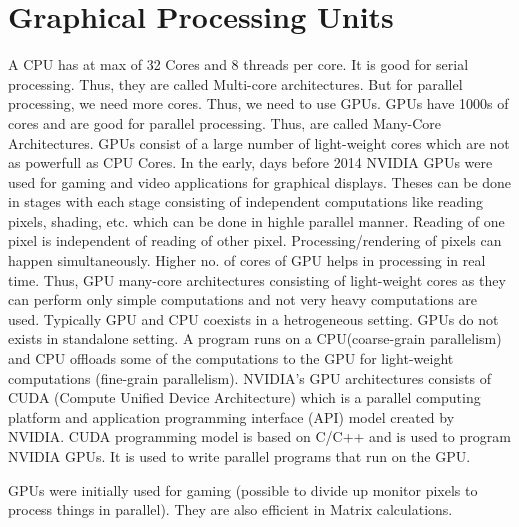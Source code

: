 \documentclass[12pt]{article}
\begin{document}
\newpage

\section{Graphical Processing Units}
A CPU has at max of 32 Cores and 8 threads per core. It is good for serial processing. Thus, they are called Multi-core architectures.
But for parallel processing, we need more cores. Thus, we need to use GPUs. GPUs have 1000s of cores and are good for parallel processing. Thus, are called Many-Core Architectures.
GPUs consist of a large number of light-weight cores which are not as powerfull as CPU Cores. In the early, days before 2014 NVIDIA GPUs were used for gaming and video applications for graphical 
displays. Theses can be done in stages with each stage consisting of independent computations like reading pixels, shading, etc. which can be done in highle parallel manner. Reading of one pixel is 
independent of reading of other pixel. Processing/rendering of pixels can happen simultaneously. Higher no. of cores of GPU helps in processing in real time. Thus,
GPU many-core architectures consisting of light-weight cores as they can perform only simple computations and not very heavy computations are used.
Typically GPU and CPU coexists in a hetrogeneous setting. GPUs do not exists in standalone setting. 
A program runs on a CPU(coarse-grain parallelism) and CPU offloads some of the computations to the GPU for light-weight computations (fine-grain parallelism).
NVIDIA's GPU architectures consists of CUDA (Compute Unified Device Architecture) which is a parallel computing platform and application programming interface (API) model created by NVIDIA.
CUDA programming model is based on C/C++ and is used to program NVIDIA GPUs. It is used to write parallel programs that run on the GPU.

GPUs were initially used for gaming (possible to divide up monitor pixels to process 
things in parallel). They are also efficient in Matrix calculations.
\end{document}
